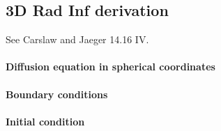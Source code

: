 \subsection{3D Rad Inf derivation}

See Carslaw and Jaeger 14.16 IV.


\paragraph{Diffusion equation in spherical coordinates}

\paragraph{Boundary conditions}

\paragraph{Initial condition}
